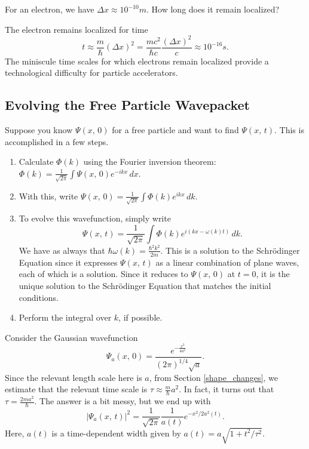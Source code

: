 \begin{framedquest*}
    For an electron, we have $\Delta x\approx 10^{-10}m$. How long does it remain localized?
\end{framedquest*}

\begin{framedansw*}
    The electron remains localized for time $$t\approx\frac{m}{\hbar}(\Delta x)^2=\frac{mc^2}{\hbar c}\frac{(\Delta x)^2}{c}\approx 10^{-16}s.$$The miniscule time scales for which electrons remain localized provide a technological difficulty for particle accelerators.    
\end{framedansw*}

\subsection{Evolving the Free Particle Wavepacket}
\label{evolving_free_particle}

Suppose you know $\Psi(x,\,0)$ for a free particle and want to find $\Psi(x,\,t)$. This is accomplished in a few steps.

\begin{enumerate}
    \item Calculate $\Phi(k)$ using the Fourier inversion theorem: $\Phi(k)=\frac{1}{\sqrt{2\pi}}\int\Psi(x,\,0)e^{-ikx}\,dx$.
    \item With this, write $\Psi(x,\,0)=\frac{1}{\sqrt{2\pi}}\int \Phi(k)e^{ikx}\,dk$.
    \item To evolve this wavefunction, simply write $$\Psi(x,\,t)=\frac{1}{\sqrt{2\pi}}\int\Phi(k)e^{i(kx-\omega(k)t)}\,dk.$$We have as always that $\hbar\omega(k)=\frac{\hbar^2 k^2}{2m}$. This is a solution to the Schrödinger Equation since it expresses $\Psi(x,\,t)$ as a linear combination of plane waves, each of which is a solution. Since it reduces to $\Psi(x,\,0)$ at $t=0$, it is the unique solution to the Schrödinger Equation that matches the initial conditions.
    \item Perform the integral over $k$, if possible.
\end{enumerate}

\begin{framedexpl}
    Consider the Gaussian wavefunction $$\Psi_a(x,\,0)=\frac{e^{-\frac{x^2}{4a^2}}}{(2\pi)^{1/4}\sqrt{a}}.$$ Since the relevant length scale here is $a$, from Section \ref{shape_changes}, we estimate that the relevant time scale is $\tau\approx\frac{m}{\hbar}a^2$. In fact, it turns out that $\tau=\frac{2ma^2}{\hbar}$. The answer is a bit messy, but we end up with $$|\Psi_a(x,\,t)|^2=\frac{1}{\sqrt{2\pi}}\frac{1}{a(t)}e^{-x^2/2a^2(t)}.$$ Here, $a(t)$ is a time-dependent width given by $a(t)=a\sqrt{1+t^2/\tau^2}$.
\end{framedexpl}

